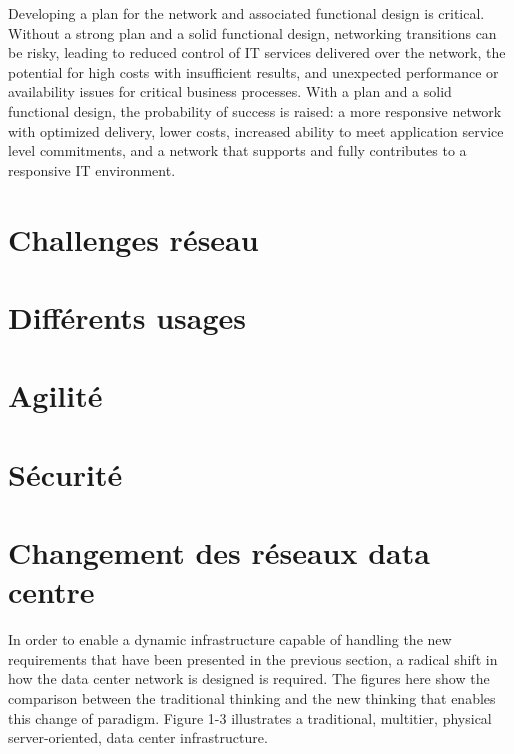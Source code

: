 Developing a plan for the network and associated functional design is critical. Without a strong plan and a solid functional design, networking transitions can be risky, leading to reduced control of IT services delivered over the network, the potential for high costs with insufficient results, and unexpected performance or availability issues for critical business processes.
With a plan and a solid functional design, the probability of success is raised: a more responsive network with optimized delivery, lower costs, increased ability to meet application service level commitments, and a network that supports and fully contributes to a responsive IT environment.

\section{Challenges réseau}


\section{Différents usages}

\section{Agilité}

\section{Sécurité}

\section{Changement des réseaux data centre}
In order to enable a dynamic infrastructure capable of handling the new requirements that have been presented in the previous section, a radical shift in how the data center network is designed is required.
The figures here show the comparison between the traditional thinking and the new thinking that enables this change of paradigm.
Figure 1-3 illustrates a traditional, multitier, physical server-oriented, data center infrastructure.


